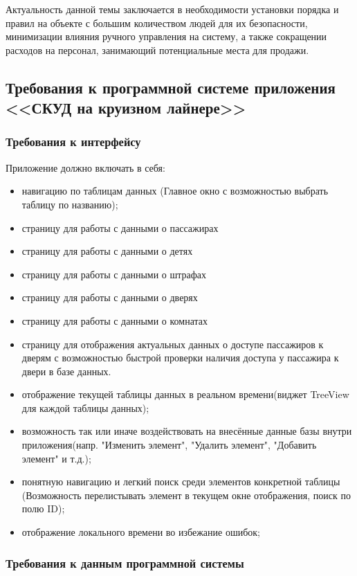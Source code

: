 Актуальность данной темы заключается в необходимости установки порядка и правил на объекте с большим количеством людей для их безопасности, минимизации влияния ручного управления на систему, а также сокращении расходов на персонал, занимающий потенциальные места для продажи.

\subsection{Требования к программной системе приложения <<СКУД на круизном лайнере>>}
\subsubsection{Требования к интерфейсу}

Приложение должно включать в себя:
\begin{itemize}
	\item навигацию по таблицам данных (Главное окно с возможностью выбрать таблицу по названию);
	\item страницу для работы с данными о пассажирах
	\item страницу для работы с данными о детях
	\item страницу для работы с данными о штрафах
	\item страницу для работы с данными о дверях
	\item страницу для работы с данными о комнатах
	\item страницу для отображения актуальных данных о доступе пассажиров к дверям с возможностью быстрой проверки наличия доступа у пассажира к двери в базе данных.
	\item отображение текущей таблицы данных в реальном времени(виджет TreeView для каждой таблицы данных);
	\item возможность так или иначе воздействовать на внесённые данные базы внутри приложения(напр. "Изменить элемент", "Удалить элемент", "Добавить элемент" и т.д.);
	\item понятную навигацию и легкий поиск среди элементов конкретной таблицы (Возможность перелистывать элемент в текущем окне отображения, поиск по полю ID);
	\item отображение локального времени во избежание ошибок;
\end{itemize}

\subsubsection{Требования к данным программной системы}

